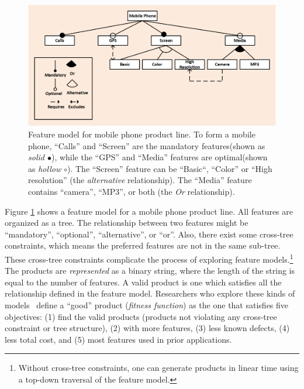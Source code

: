 \documentclass[sigconf,anonymous,review]{acmart}
\begin{document}
\begin{figure}[!t]
    \small
    \includegraphics[width=\linewidth]{img/ft.png}
    \caption{Feature model for mobile phone product line. To form a mobile phone, ``Calls'' and ``Screen'' are the mandatory features(shown as \textit{solid $\bullet$}), while the ``GPS'' and ``Media'' features are optimal(shown as \textit{hollow $\circ$}). The ``Screen'' feature can be ``Basic``, ``Color'' or ``High resolution'' (the \textit{alternative} relationship). The ``Media'' feature contains ``camera'', ``MP3'', or both (the \textit{Or} relationship).}
    \label{fig:mobile}
\end{figure}


Figure \ref{fig:mobile} shows a feature model for a mobile phone
product line. All features are organized as a tree. The relationship
between two features might be ``mandatory'', ``optional'',
``alternative'', or ``or''. Also, there exist some cross-tree constraints, which means the preferred features are not in the same sub-tree. These cross-tree constraints complicate the process of exploring feature models.\footnote{Without cross-tree constraints, one can generate products in linear time using a top-down traversal of the feature model.} The products are \textit{represented} as a binary string, where the length of the string is equal to the number of features. A valid product is one which satisfies all the relationship defined in the feature model.
Researchers who explore these kinds of models~\cite{sayyad13a, sayyad13b, harman2014search, henard2015combining}
define a ``good'' product (\textit{fitness function}) as the one that satisfies five objectives:
(1) find the valid products (products not violating any cross-tree constraint or tree structure), (2) with more features, (3) less known defects, (4) less total cost, and (5) most features used in prior applications.
\end{document}
